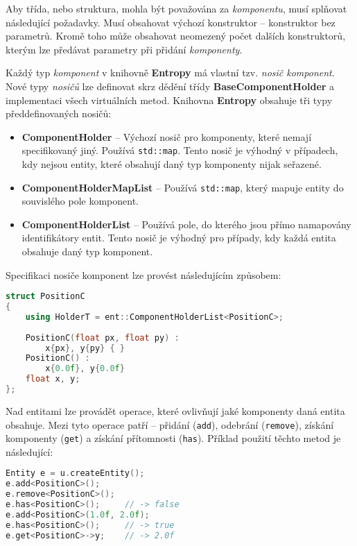 \noindent Aby třída, nebo struktura, mohla být považována za \emph{komponentu}, musí splňovat následující požadavky. Musí obsahovat výchozí konstruktor -- konstruktor bez parametrů. Kromě toho může obsahovat neomezený počet dalších konstruktorů, kterým lze předávat parametry při přidání \emph{komponenty}. 

Každý typ \emph{komponent} v knihovně \textbf{Entropy} má vlastní tzv. \emph{nosič komponent}. Nové typy \emph{nosičů} lze definovat skrz dědění třídy \textbf{BaseComponentHolder} a implementaci všech virtuálních metod. Knihovna \textbf{Entropy} obsahuje tři typy předdefinovaných nosičů:

\begin{itemize}
	\item \textbf{ComponentHolder} -- Výchozí nosič pro komponenty, které nemají specifikovaný jiný. Používá \texttt{std::map}. Tento nosič je výhodný v případech, kdy nejsou entity, které obsahují daný typ komponenty nijak seřazené.
	\item \textbf{ComponentHolderMapList} -- Používá \texttt{std::map}, který mapuje entity do souvislého pole komponent.
	\item \textbf{ComponentHolderList} -- Používá pole, do kterého jsou přímo namapovány identifikátory entit. Tento nosič je výhodný pro případy, kdy každá entita obsahuje daný typ komponent.
\end{itemize}

\noindent Specifikaci nosiče komponent lze provést následujícím způsobem:

\begin{lstlisting}[backgroundcolor = \color{lightgray}, language = C++, xleftmargin = 2cm, framexleftmargin = 1em, tabsize=4]
struct PositionC
{
	using HolderT = ent::ComponentHolderList<PositionC>;
	
	PositionC(float px, float py) :
		x{px}, y{py} { }
	PositionC() : 
		x{0.0f}, y{0.0f}
	float x, y;
};
\end{lstlisting}

Nad entitami lze provádět operace, které ovlivňují jaké komponenty daná entita obsahuje. Mezi tyto operace patří -- přidání (\texttt{add}), odebrání (\texttt{remove}), získání komponenty (\texttt{get}) a získání přítomnosti (\texttt{has}). Příklad použití těchto metod je následující:

\begin{lstlisting}[backgroundcolor = \color{lightgray}, language = C++, xleftmargin = 2cm, framexleftmargin = 1em, tabsize=4]
Entity e = u.createEntity();
e.add<PositionC>();
e.remove<PositionC>();
e.has<PositionC>();		// -> false
e.add<PositionC>(1.0f, 2.0f);
e.has<PositionC>();		// -> true
e.get<PositionC>->y;	// -> 2.0f
\end{lstlisting}

